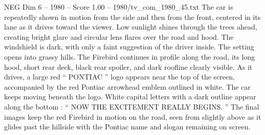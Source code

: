 \begin{textsample}{NEG Dim 6 – 1980 – Score 1.00 – 1980/tv\_com\_1980\_45.txt}
The car is repeatedly shown in motion from the side and then from the front, centered in its lane as it drives toward the viewer.
Low sunlight shines through the trees ahead, creating bright glare and circular lens flares over the road and hood.
The windshield is dark, with only a faint suggestion of the driver inside.
The setting opens into grassy hills.
The Firebird continues in profile along the road, its long hood, short rear deck, black rear spoiler, and dark roofline clearly visible.
As it drives, a large red “ PONTIAC ” logo appears near the top of the screen, accompanied by the red Pontiac arrowhead emblem outlined in white.
The car keeps moving beneath the logo.
White capital letters with a dark outline appear along the bottom : “ NOW THE EXCITEMENT REALLY BEGINS. ” The final images keep the red Firebird in motion on the road, seen from slightly above as it glides past the hillside with the Pontiac name and slogan remaining on screen.

\end{textsample}
